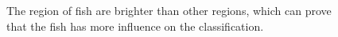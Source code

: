 \documentclass[conference]{IEEEtran}
\begin{document}
 








\begin{figure}[!ht]

\centering
{}
  \hspace{0.15in}
  \hspace{0.15in}
  \caption{The region of fish are brighter than other regions, which can prove that the fish has more influence on the classification.}
  \label{fig:pool}
\end{figure}
\end{document}
